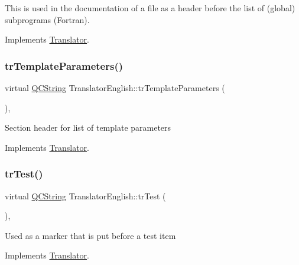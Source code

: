 This is used in the documentation of a file as a header before the list of (global) subprograms (Fortran). 

Implements \mbox{\hyperlink{class_translator}{Translator}}.

\mbox{\label{class_translator_english_a3791305a5c29ecc8490a3e20ec63b87f}} 
\subsubsection{\texorpdfstring{trTemplateParameters()}{trTemplateParameters()}}
{\footnotesize\ttfamily virtual \mbox{\hyperlink{class_q_c_string}{Q\+C\+String}} Translator\+English\+::tr\+Template\+Parameters (\begin{DoxyParamCaption}{ }\end{DoxyParamCaption})\hspace{0.3cm}{\ttfamily [inline]}, {\ttfamily [virtual]}}

Section header for list of template parameters 

Implements \mbox{\hyperlink{class_translator}{Translator}}.

\mbox{\label{class_translator_english_a9f3a265babb3cb64e55997deb833c0a6}} 
\subsubsection{\texorpdfstring{trTest()}{trTest()}}
{\footnotesize\ttfamily virtual \mbox{\hyperlink{class_q_c_string}{Q\+C\+String}} Translator\+English\+::tr\+Test (\begin{DoxyParamCaption}{ }\end{DoxyParamCaption})\hspace{0.3cm}{\ttfamily [inline]}, {\ttfamily [virtual]}}

Used as a marker that is put before a test item 

Implements \mbox{\hyperlink{class_translator}{Translator}}.

\mbox{\label{class_translator_english_a98d51a86d968b06341e6eca674b1e895}} 
